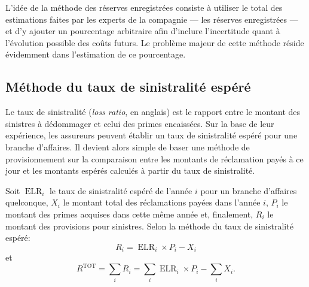 L'idée de la méthode des réserves enregistrées consiste à utiliser le
total des estimations faites par les experts de la compagnie --- les
réserves enregistrées --- et d'y ajouter un pourcentage arbitraire
afin d'inclure l'incertitude quant à l'évolution possible des coûts
futurs. Le problème majeur de cette méthode réside évidemment dans
l'estimation de ce pourcentage.

\subsection{Méthode du taux de sinistralité espéré}

Le taux de sinistralité (\emph{loss ratio}, en anglais) est le rapport
entre le montant des sinistres à dédommager et celui des primes
encaissées. Sur la base de leur expérience, les assureurs peuvent
établir un taux de sinistralité espéré pour une branche d'affaires. Il
devient alors simple de baser une méthode de provisionnement sur la
comparaison entre les montants de réclamation payés à ce jour et les
montants espérés calculés à partir du taux de sinistralité.

Soit $\operatorname{ELR}_i$ le taux de sinistralité espéré de l'année
$i$ pour un branche d'affaires quelconque, $X_i$ le montant total des
réclamations payées dans l'année $i$, $P_i$ le montant des primes
acquises dans cette même année et, finalement, $R_i$ le montant des
provisions pour sinistres. Selon la méthode du taux de sinistralité
espéré:
\begin{equation}
  \label{eq:presentation:ELR}
  R_i = \operatorname{ELR}_i \times P_i - X_i
\end{equation}
et
\begin{equation}
  \label{eq:presentation:ELR:TOT}
  R^{\text{TOT}} = \sum_i R_i
  = \sum_i \operatorname{ELR}_i \times P_i - \sum_i X_i.
\end{equation}

